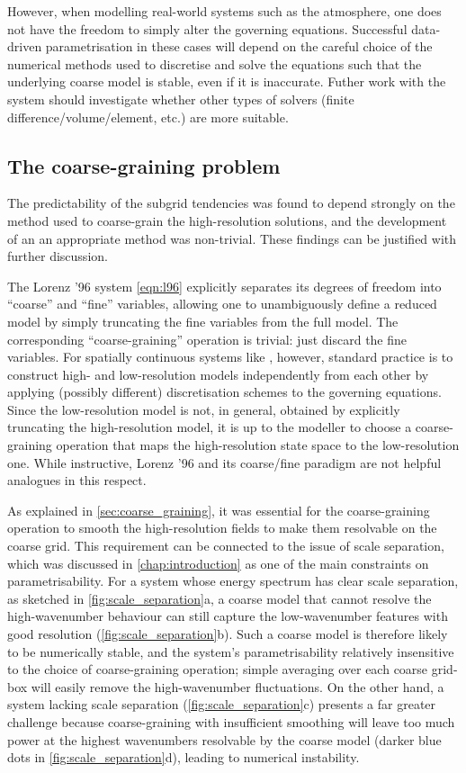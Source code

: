 \documentclass[../main.tex]{subfiles}
\begin{document}
However, when modelling real-world systems such as the atmosphere, one does
not have the freedom to simply alter the governing equations. Successful
data-driven parametrisation in these cases will depend on the careful choice of
the numerical methods used to discretise and solve the equations such that
the underlying coarse model is stable, even if it is inaccurate. Futher work
with the \rb{} system should investigate whether other types of solvers
(finite difference/volume/element, etc.) are more suitable.


\subsection{The coarse-graining problem}
The predictability of the subgrid tendencies was found to depend strongly on
the method used to coarse-grain the high-resolution solutions, and the
development of an an appropriate method was non-trivial. These findings
can be justified with further discussion.

The Lorenz '96 system \cref{eqn:l96} explicitly separates its degrees of
freedom into ``coarse'' and ``fine'' variables, allowing one to unambiguously
define a reduced model by simply truncating the fine variables from the full
model. The corresponding ``coarse-graining'' operation is trivial: just discard
the fine variables. For spatially continuous systems like \rb{}, however,
standard practice is to construct high- and low-resolution models independently
from each other by applying (possibly different) discretisation schemes to the
governing equations. Since the low-resolution model is not, in general,
obtained by explicitly truncating the high-resolution model, it is up to the
modeller to choose a coarse-graining operation that maps the high-resolution
state space to the low-resolution one. While instructive, Lorenz '96 and its
coarse/fine paradigm are not helpful analogues in this respect.

As explained in \cref{sec:coarse_graining}, it was essential for the
coarse-graining operation to smooth the high-resolution fields to make them
resolvable on the coarse grid. This requirement can be connected to the issue
of scale separation, which was discussed in \cref{chap:introduction} as
one of the main constraints on parametrisability. For a system whose energy
spectrum has clear scale separation, as sketched in
\cref{fig:scale_separation}a, a coarse model that cannot resolve the
high-wavenumber behaviour can still capture the low-wavenumber features with
good resolution (\cref{fig:scale_separation}b). Such a coarse model is
therefore likely to be numerically stable, and the system's parametrisability
relatively insensitive to the choice of coarse-graining operation; simple
averaging over each coarse grid-box will easily remove the high-wavenumber
fluctuations. On the other hand, a system lacking scale separation
(\cref{fig:scale_separation}c) presents a far greater challenge because
coarse-graining with insufficient smoothing will leave too much power at the
highest wavenumbers resolvable by the coarse model (darker blue dots in
\cref{fig:scale_separation}d), leading to numerical instability.
\end{document}
